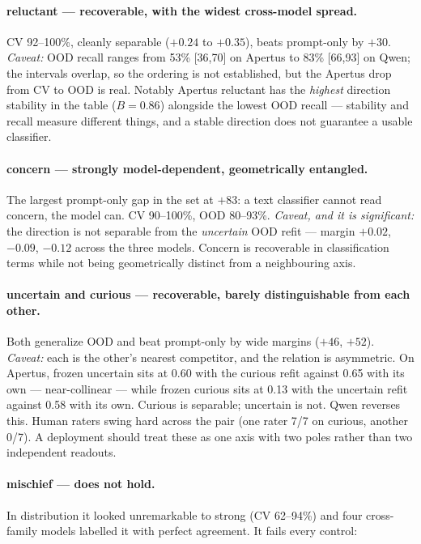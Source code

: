 \documentclass[11pt]{article}
\begin{document}
\paragraph{reluctant --- recoverable, with the widest cross-model spread.}
CV 92--100\%, cleanly separable ($+0.24$ to $+0.35$), beats prompt-only by $+30$. \emph{Caveat:}
OOD recall ranges from 53\% [36,70] on Apertus to 83\% [66,93] on Qwen; the intervals overlap, so
the ordering is not established, but the Apertus drop from CV to OOD is real. Notably Apertus
reluctant has the \emph{highest} direction stability in the table ($B = 0.86$) alongside the
lowest OOD recall --- stability and recall measure different things, and a stable direction does
not guarantee a usable classifier.

\paragraph{concern --- strongly model-dependent, geometrically entangled.}
The largest prompt-only gap in the set at $+83$: a text classifier cannot read concern, the model
can. CV 90--100\%, OOD 80--93\%. \emph{Caveat, and it is significant:} the direction is not
separable from the \emph{uncertain} OOD refit --- margin $+0.02$, $-0.09$, $-0.12$ across the
three models. Concern is recoverable in classification terms while not being geometrically
distinct from a neighbouring axis.

\paragraph{uncertain and curious --- recoverable, barely distinguishable from each other.}
Both generalize OOD and beat prompt-only by wide margins ($+46$, $+52$). \emph{Caveat:} each is
the other's nearest competitor, and the relation is asymmetric. On Apertus, frozen uncertain sits
at 0.60 with the curious refit against 0.65 with its own --- near-collinear --- while frozen
curious sits at 0.13 with the uncertain refit against 0.58 with its own. Curious is separable;
uncertain is not. Qwen reverses this. Human raters swing hard across the pair (one rater 7/7 on
curious, another 0/7). A deployment should treat these as one axis with two poles rather than two
independent readouts.

\paragraph{mischief --- does not hold.}
In distribution it looked unremarkable to strong (CV 62--94\%) and four cross-family models
labelled it with perfect agreement. It fails every control:
\end{document}
